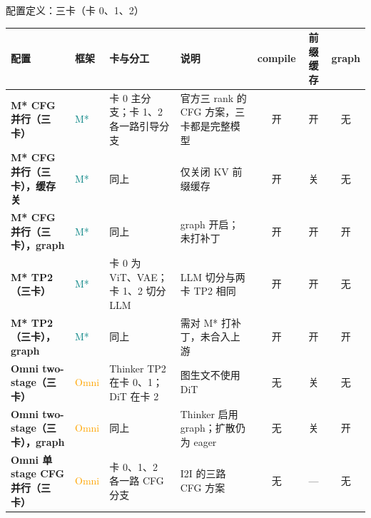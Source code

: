 \begin{frame}[t]{配置定义：三卡（卡 0、1、2）}
\scriptsize\def\codesize{\relax}
\renewcommand{\arraystretch}{1.1}\setlength{\tabcolsep}{2.5pt}
\begin{tabularx}{\textwidth}{>{\bfseries}p{3.4cm} p{1.0cm} p{3.4cm} Y c c c}
\toprule
{}
配置 & 框架 & 卡与分工 & 说明 & compile & 前缀缓存 & graph \\
\midrule
M* CFG 并行（三卡） & \textcolor{Teal}{M*} & 卡 0 主分支；卡 1、2 各一路引导分支 & 官方三 rank 的 CFG 方案，三卡都是完整模型 & 开 & 开 & 无 \\
M* CFG 并行（三卡），缓存关 & \textcolor{Teal}{M*} & 同上 & 仅关闭 KV 前缀缓存 & 开 & 关 & 无 \\
M* CFG 并行（三卡），graph & \textcolor{Teal}{M*} & 同上 & graph 开启；未打补丁 & 开 & 开 & 开 \\
M* TP2（三卡） & \textcolor{Teal}{M*} & 卡 0 为 ViT、VAE；卡 1、2 切分 LLM & LLM 切分与两卡 TP2 相同 & 开 & 开 & 无 \\
M* TP2（三卡），graph & \textcolor{Teal}{M*} & 同上 & 需对 M* 打补丁，未合入上游 & 开 & 开 & 开 \\
Omni two-stage（三卡） & \textcolor{Orange}{Omni} & Thinker TP2 在卡 0、1；DiT 在卡 2 & 图生文不使用 DiT & 无 & 关 & 无 \\
Omni two-stage（三卡），graph & \textcolor{Orange}{Omni} & 同上 & Thinker 启用 graph；扩散仍为 eager & 无 & 关 & 开 \\
Omni 单 stage CFG 并行（三卡） & \textcolor{Orange}{Omni} & 卡 0、1、2 各一路 CFG 分支 & I2I 的三路 CFG 方案 & 无 & — & 无 \\
\bottomrule
\end{tabularx}
\vspace{3pt}
\end{frame}


